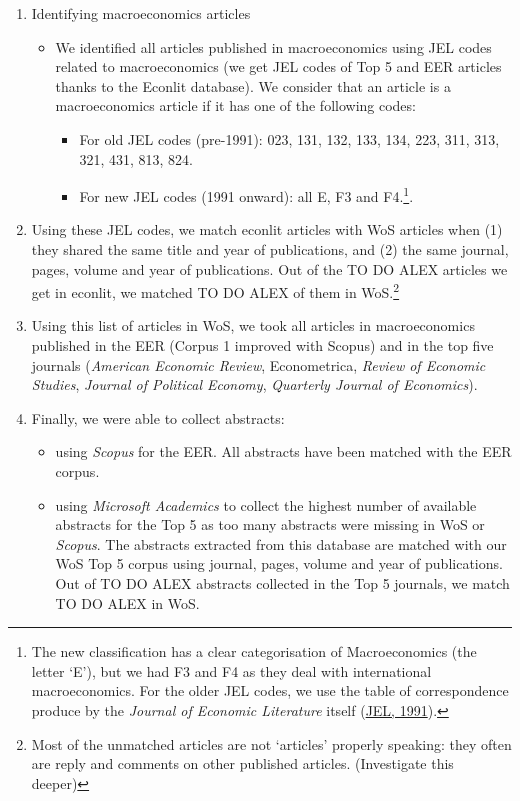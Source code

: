 \documentclass[]{elsarticle} %
\providecommand{\tightlist}{%
  \setlength{\itemsep}{0pt}\setlength{\parskip}{0pt}}
\begin{document}
\begin{enumerate}
\def\labelenumi{\arabic{enumi}.}
\item
  Identifying macroeconomics articles

  \begin{itemize}
  \item
    We identified all articles published in macroeconomics using JEL
    codes related to macroeconomics (we get JEL codes of Top 5 and EER
    articles thanks to the Econlit database). We consider that an
    article is a macroeconomics article if it has one of the following
    codes:

    \begin{itemize}
    \tightlist
    \item
      For old JEL codes (pre-1991): 023, 131, 132, 133, 134, 223, 311,
      313, 321, 431, 813, 824.
    \item
      For new JEL codes (1991 onward): all E, F3 and F4.\footnote{The
        new classification has a clear categorisation of Macroeconomics
        (the letter `E'), but we had F3 and F4 as they deal with
        international macroeconomics. For the older JEL codes, we use
        the table of correspondence produce by the \emph{Journal of
        Economic Literature} itself
        (\protect\hyperlink{ref-jel1991}{JEL, 1991}).}.
    \end{itemize}
  \end{itemize}
\item
  Using these JEL codes, we match econlit articles with WoS articles
  when (1) they shared the same title and year of publications, and (2)
  the same journal, pages, volume and year of publications. Out of the
  TO DO ALEX articles we get in econlit, we matched TO DO ALEX of them
  in WoS.\footnote{Most of the unmatched articles are not `articles'
    properly speaking: they often are reply and comments on other
    published articles. (Investigate this deeper)}
\item
  Using this list of articles in WoS, we took all articles in
  macroeconomics published in the EER (Corpus 1 improved with Scopus)
  and in the top five journals (\emph{American Economic Review},
  Econometrica, \emph{Review of Economic Studies}, \emph{Journal of
  Political Economy}, \emph{Quarterly Journal of Economics}).
\item
  Finally, we were able to collect abstracts:

  \begin{itemize}
  \tightlist
  \item
    using \emph{Scopus} for the EER. All abstracts have been matched
    with the EER corpus.
  \item
    using \emph{Microsoft Academics} to collect the highest number of
    available abstracts for the Top 5 as too many abstracts were missing
    in WoS or \emph{Scopus}. The abstracts extracted from this database
    are matched with our WoS Top 5 corpus using journal, pages, volume
    and year of publications. Out of TO DO ALEX abstracts collected in
    the Top 5 journals, we match TO DO ALEX in WoS.
  \end{itemize}
\end{enumerate}
\end{document}
